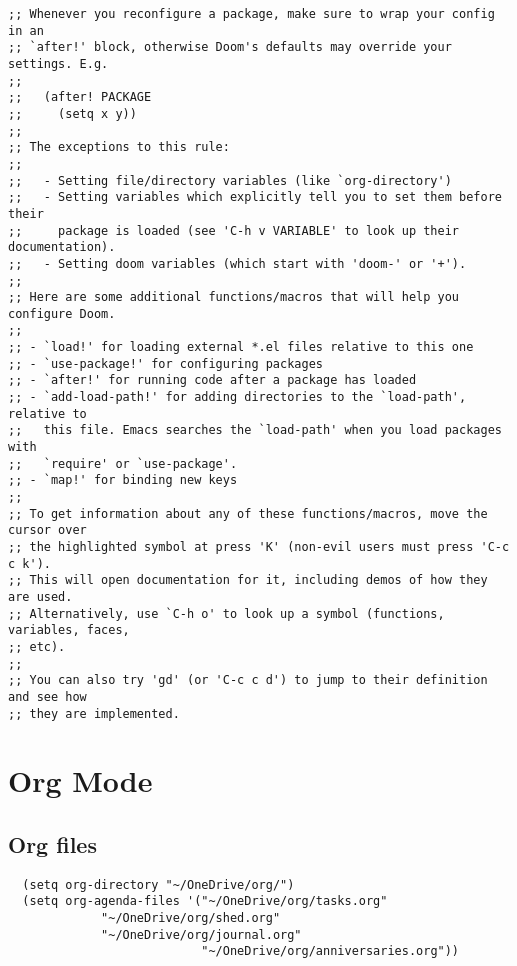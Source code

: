 \documentclass[11pt]{article}
\begin{document}
\begin{verbatim}
;; Whenever you reconfigure a package, make sure to wrap your config in an
;; `after!' block, otherwise Doom's defaults may override your settings. E.g.
;;
;;   (after! PACKAGE
;;     (setq x y))
;;
;; The exceptions to this rule:
;;
;;   - Setting file/directory variables (like `org-directory')
;;   - Setting variables which explicitly tell you to set them before their
;;     package is loaded (see 'C-h v VARIABLE' to look up their documentation).
;;   - Setting doom variables (which start with 'doom-' or '+').
;;
;; Here are some additional functions/macros that will help you configure Doom.
;;
;; - `load!' for loading external *.el files relative to this one
;; - `use-package!' for configuring packages
;; - `after!' for running code after a package has loaded
;; - `add-load-path!' for adding directories to the `load-path', relative to
;;   this file. Emacs searches the `load-path' when you load packages with
;;   `require' or `use-package'.
;; - `map!' for binding new keys
;;
;; To get information about any of these functions/macros, move the cursor over
;; the highlighted symbol at press 'K' (non-evil users must press 'C-c c k').
;; This will open documentation for it, including demos of how they are used.
;; Alternatively, use `C-h o' to look up a symbol (functions, variables, faces,
;; etc).
;;
;; You can also try 'gd' (or 'C-c c d') to jump to their definition and see how
;; they are implemented.
\end{verbatim}
\section{Org Mode}
\label{sec:orgecb00af}
\subsection{Org files}
\label{sec:org1a655ad}
\begin{verbatim}
  (setq org-directory "~/OneDrive/org/")
  (setq org-agenda-files '("~/OneDrive/org/tasks.org"
  			 "~/OneDrive/org/shed.org"
  			 "~/OneDrive/org/journal.org"
                           "~/OneDrive/org/anniversaries.org"))
\end{verbatim}
\end{document}
